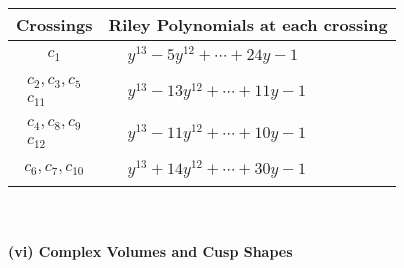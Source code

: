\documentclass[1p]{elsarticle_modified}
\theoremstyle{definition}
\begin{document}
\begin{tabular}{m{50pt}|m{274pt}}
Crossings & \hspace{64pt}Riley Polynomials at each crossing \\
\hline $$\begin{aligned}c_{1}\end{aligned}$$&$\begin{aligned}
&y^{13}-5 y^{12}+\cdots+24 y-1
\end{aligned}$\\
\hline $$\begin{aligned}c_{2},c_{3},c_{5}\\c_{11}\end{aligned}$$&$\begin{aligned}
&y^{13}-13 y^{12}+\cdots+11 y-1
\end{aligned}$\\
\hline $$\begin{aligned}c_{4},c_{8},c_{9}\\c_{12}\end{aligned}$$&$\begin{aligned}
&y^{13}-11 y^{12}+\cdots+10 y-1
\end{aligned}$\\
\hline $$\begin{aligned}c_{6},c_{7},c_{10}\end{aligned}$$&$\begin{aligned}
&y^{13}+14 y^{12}+\cdots+30 y-1
\end{aligned}$\\
\hline
\end{tabular}\\~\\
\newpage\flushleft \textbf{(vi) Complex Volumes and Cusp Shapes}
\end{document}
